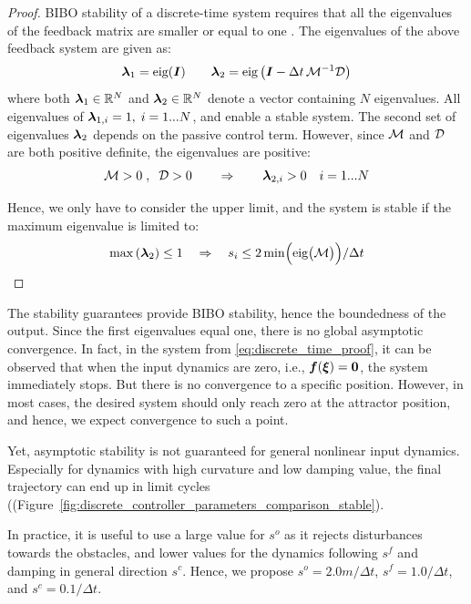 \begin{proof}
BIBO stability of a discrete-time system requires that all the eigenvalues of the feedback matrix are smaller or equal to one \parencite{friedland2012control}.
The eigenvalues of the above feedback system are given as:
\begin{equation}
	\boldsymbol{\lambda}_1 = \text{eig}(\boldsymbol{I}) \qquad \boldsymbol{\lambda}_2 = \text{eig} \left(\boldsymbol{I} - \Delta t \, \mathcal{M}^{-1} \mathcal{D} \right)
\end{equation}
where both $\boldsymbol{\lambda}_1 \in \mathbb{R}^N$ and $\boldsymbol{\lambda}_2 \in \mathbb{R}^N$ denote a vector containing $N$ eigenvalues.
All eigenvalues of $\boldsymbol{\lambda}_{1, i} = 1, \; i = 1...N$, and enable a stable system. 
The second set of eigenvalues $\boldsymbol{\lambda}_2$  depends on the passive control term. 
However, since $\mathcal{M}$ and $\mathcal{D}$ are both positive definite, the eigenvalues are positive:
\begin{equation}
	\mathcal{M} > 0 \; , \;\; \mathcal{D} > 0 
	\qquad \Rightarrow \qquad
	\boldsymbol{\lambda}_{2, i} > 0 \quad i = 1...N
\end{equation}

Hence, we only have to consider the upper limit, and the system is stable if the maximum eigenvalue is limited to:
\begin{equation}
	\max \left(\boldsymbol{\lambda}_2 \right) \leq 1 
	\quad \Rightarrow \quad
	s_{i} \leq 2 \min \Bigl( \text{eig}\bigl(\mathcal{M}\bigr)  \Bigr) / \Delta t
\end{equation}
\end{proof}

The stability guarantees provide BIBO stability, hence the boundedness of the output. 
Since the first eigenvalues equal one, there is no global asymptotic convergence. 
In fact, in the system from \eqref{eq:discrete_time_proof}, it can be observed that when the input dynamics are zero, i.e., $\boldsymbol{f}(\boldsymbol{\xi}) = \boldsymbol{0}$, the system immediately stops. But there is no convergence to a specific position.
However, in most cases, the desired system should only reach zero at the attractor position, and hence, we expect convergence to such a point.

Yet, asymptotic stability is not guaranteed for general nonlinear input dynamics. Especially for dynamics with high curvature and low damping value, the final trajectory can end up in limit cycles ((Figure~\ref{fig:discrete_controller_parameters_comparison_stable}).

In practice, it is useful to use a large value for $s^{o}$ as it rejects disturbances towards the obstacles, and lower values for the dynamics following $s^{f}$ and damping in general direction $s^{c}$. Hence, we propose $s^{o} = 2.0 m / \Delta t$, $s^{f} = 1.0 / \Delta t$, and $s^c = 0.1 / \Delta t$.


